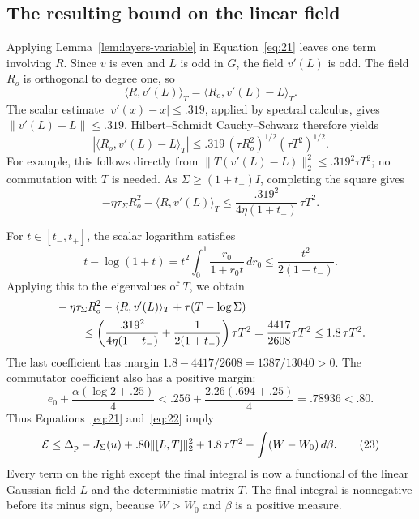 \subsection{The resulting bound on the linear field}

Applying Lemma~\ref{lem:layers-variable} in
Equation~\eqref{eq:21} leaves one term involving \(R\).
Since \(v\) is even and \(L\) is odd in \(G\), the field \(v'(L)\)
is odd.  The field \(R_o\) is orthogonal to degree one, so
\[
 \langle R,v'(L)\rangle_T
 =\langle R_o,v'(L)-L\rangle_T.
\]
The scalar estimate \(|v'(x)-x|\le.319\), applied by spectral
calculus, gives \(\|v'(L)-L\|\le.319\).
Hilbert--Schmidt Cauchy--Schwarz therefore yields
\[
 |\langle R_o,v'(L)-L\rangle_T|
 \le .319\,(\tau R_o^2)^{1/2}(\tau T^2)^{1/2}.
\]
For example, this follows directly from
\(\|T(v'(L)-L)\|_2^2\le .319^2\tau T^2\);
no commutation with \(T\) is needed.
As \(\Sigma\ge(1+t_-)I\), completing the square gives
\[
 -\eta\tau_\Sigma R_o^2-\langle R,v'(L)\rangle_T
 \le\frac{.319^2}{4\eta(1+t_-)}\,\tau T^2.
\]

For \(t\in[t_-,t_+]\), the scalar logarithm satisfies
\[
 t-\log(1+t)
 =t^2\int_0^1\frac{r_0}{1+r_0t}\,dr_0
 \le\frac{t^2}{2(1+t_-)}.
\]
Applying this to the eigenvalues of \(T\), we obtain
\[
 \begin{aligned}
 &-\eta\tau_\Sigma R_o^2-\langle R,v'(L)\rangle_T
                +\tau(T-\log\Sigma)\\
 &\hspace{8mm}\le
 \left(\frac{.319^2}{4\eta(1+t_-)}
                   +\frac1{2(1+t_-)}\right)\tau T^2
 =\frac{4417}{2608}\tau T^2
 \le1.8\,\tau T^2.
 \end{aligned}
\]
The last coefficient has margin
\(1.8-4417/2608=1387/13040>0\).
The commutator coefficient also has a positive margin:
\[
 e_0+\frac{\alpha(\log2+.25)}4
 <.256+\frac{2.26(.694+.25)}4
 =.78936<.80.
\]
Thus Equations~\eqref{eq:21} and~\eqref{eq:22} imply
\begin{equation}
 \mathcal E\le
 \Delta_{\rm p}-J_\Sigma(u)+.80\|[L,T]\|_2^2
       +1.8\,\tau T^2-\int(W-W_0)\,d\beta.
 \tag{23}\label{eq:23}
\end{equation}
Every term on the right except the final integral is now a
functional of the linear Gaussian field \(L\) and the deterministic
matrix \(T\).  The final integral is nonnegative before its minus
sign, because \(W>W_0\) and \(\beta\) is a positive measure.
